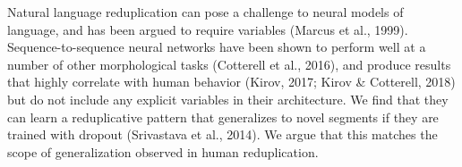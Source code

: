Natural language reduplication can pose a challenge to neural models of language, and has been argued to require variables (Marcus et al., 1999). Sequence-to-sequence neural networks have been shown to perform well at a number of other morphological tasks (Cotterell et al., 2016), and produce results that highly correlate with human behavior (Kirov, 2017; Kirov \& Cotterell, 2018) but do not include any explicit variables in their architecture. We find that they can learn a reduplicative pattern that generalizes to novel segments if they are trained with dropout (Srivastava et al., 2014). We argue that this matches the scope of generalization observed in human reduplication.
